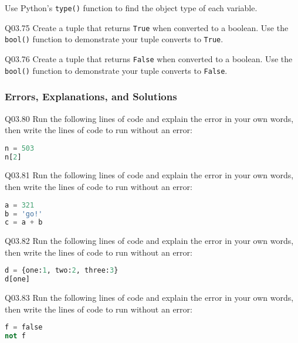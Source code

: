 \documentclass{book}
\newenvironment{problems}{}{}  %
\newcommand{\passthrough}[1]{#1}
\begin{document}
Use Python's \passthrough{\lstinline!type()!} function to find the
object type of each variable.

Q03.75 Create a tuple that returns \passthrough{\lstinline!True!} when
converted to a boolean. Use the \passthrough{\lstinline!bool()!}
function to demonstrate your tuple converts to
\passthrough{\lstinline!True!}.

Q03.76 Create a tuple that returns \passthrough{\lstinline!False!} when
converted to a boolean. Use the \passthrough{\lstinline!bool()!}
function to demonstrate your tuple converts to
\passthrough{\lstinline!False!}.
    




    
        \begin{problems}
        \hypertarget{errors-explanations-and-solutions}{%
\subsubsection{Errors, Explanations, and
Solutions}\label{errors-explanations-and-solutions}}

Q03.80 Run the following lines of code and explain the error in your own
words, then write the lines of code to run without an error:

\begin{lstlisting}[language=Python]
n = 503
n[2]
\end{lstlisting}

Q03.81 Run the following lines of code and explain the error in your own
words, then write the lines of code to run without an error:

\begin{lstlisting}[language=Python]
a = 321
b = 'go!'
c = a + b
\end{lstlisting}

Q03.82 Run the following lines of code and explain the error in your own
words, then write the lines of code to run without an error:

\begin{lstlisting}[language=Python]
d = {one:1, two:2, three:3}
d[one]
\end{lstlisting}

Q03.83 Run the following lines of code and explain the error in your own
words, then write the lines of code to run without an error:

\begin{lstlisting}[language=Python]
f = false
not f
\end{lstlisting}


\end{problems}
\end{document}
